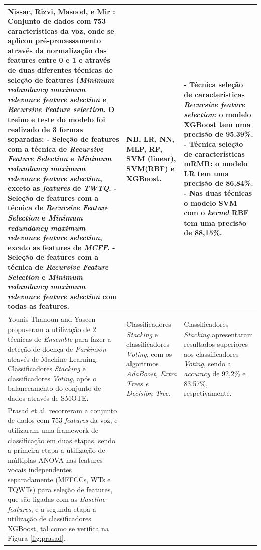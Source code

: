 \documentclass[12pt,a4paper,twoside]{report}
\begin{document}
{\begin{longtable}{|p{6cm}|p{4cm}|p{6cm}|}
Nissar, Rizvi, Masood, e Mir \cite{nissaretall}:
Conjunto de dados com 753 características da voz, onde se aplicou
pré-processamento através da normalização das features entre 0 e 1 e
através de duas diferentes técnicas de seleção de features (\textit{Minimum
redundancy maximum relevance feature selection} e \textit{ Recursive Feature
selection}.
O treino e teste do modelo foi realizado de 3 formas separadas:
-  Seleção de features com a técnica de \textit{Recursive Feature Selection} e
\textit{Minimum redundancy maximum relevance feature selection}, exceto
as \textit{features} de \textit{TWTQ}.
- Seleção de features com a técnica de \textit{Recursive Feature Selection} e
\textit{Minimum redundancy maximum relevance feature selection}, exceto
as features de \textit{MCFF}.
- Seleção de features com a técnica de \textit{Recursive Feature Selection} e
\textit{Minimum redundancy maximum relevance feature selection} com todas as features.
& \gls{NB}, \gls{LR}, \gls{NN}, \gls{MLP}, \gls{RF}, \gls{SVM} (linear), \gls{SVM}(\gls{RBF}) e \gls{XGBoost}.
& - Técnica seleção de características \textit{Recursive feature selection}: o modelo \Gls{XGBoost} tem uma precisão de 95.39\%.
- Técnica seleção de características \gls{mRMR}: o modelo \gls{LR} tem uma precisão de 86,84\%.
- Nas duas técnicas o modelo \gls{SVM} com o \textit{kernel} \gls{RBF} tem uma precisão de 88,15\%. \\ \hline

Younis Thanoun and Yaseen \cite{thanoun} propuseram a utilização de 2 técnicas de \textit{Ensemble} para fazer a deteção de doença de \textit{Parkinson} através de Machine Learning: Classificadores \textit{Stacking} e classificadores \textit{Voting}, após o balanceamento do conjunto de dados através de \gls{SMOTE}.

& Classificadores \textit{Stacking} e classificadores \textit{Voting}, com os algoritmos \textit{AdaBoost, Extra Trees e Decision Tree}.

& Classificadores \textit{Stacking} apresentaram resultados superiores aos classificadores \textit{Voting}, sendo a \textit{accuracy} de 92,2\% e 83.57\%, respetivamente. \\ \hline

Prasad et al. \cite{Prasad2020}  recorreram a conjunto de dados com 753 \textit{features} da voz, e utilizaram uma framework de classificação em duas etapas, sendo a primeira etapa a utilização de múltiplas \gls{ANOVA} nas features vocais independentes separadamente (MFFCCs, WTs e TQWTs) para seleção de features, que são ligadas com as \textit{Baseline features}, e a segunda etapa a utilização de classificadores \gls{XGBoost}, tal como se verifica na Figura \ref{fig:prasad}. 


\end{longtable}}
\end{document}
